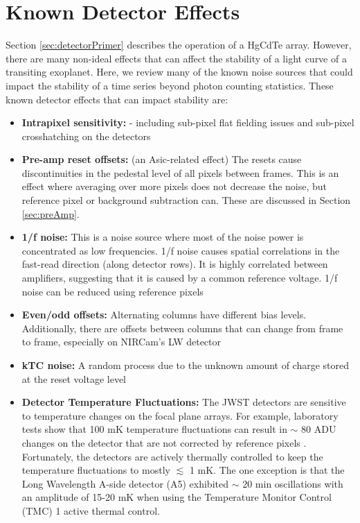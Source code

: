 \documentclass{aastex62}
\begin{document}
\section{Known Detector Effects}\label{sec:knownEffects}
Section \ref{sec:detectorPrimer} describes the operation of a HgCdTe array.
However, there are many non-ideal effects that can affect the stability of a light curve of a transiting exoplanet.
Here, we review many of the known noise sources that could impact the stability of a time series beyond photon counting statistics. These known detector effects that can impact stability are:

\begin{itemize}[noitemsep]
	\item \textbf{Intrapixel sensitivity:} - including sub-pixel flat fielding issues and sub-pixel crosshatching on the detectors \citep{shapiro2018crosshatch}
	\item \textbf{Pre-amp reset offsets:} (an Asic-related effect) 
The resets cause discontinuities in the pedestal level of all pixels between frames. This is an effect where averaging over more pixels does not decrease the noise, but reference pixel or background subtraction can. These are discussed in Section \ref{sec:preAmp}.
	\item \textbf{1/f noise:} This is a noise source where most of the noise power is concentrated as low frequencies. 1/f noise causes spatial correlations in the fast-read direction (along detector rows). It is highly correlated between amplifiers, suggesting that it is caused by a common reference voltage. 1/f noise can be reduced using reference pixels
	\item \textbf{Even/odd offsets:} Alternating columns have different bias levels. Additionally, there are offsets between columns that can change from frame to frame, especially on NIRCam's LW detector
	\item \textbf{kTC noise:} A random process due to the unknown amount of charge stored at the reset voltage level
	\item \textbf{Detector Temperature Fluctuations:} The JWST detectors are sensitive to temperature changes on the focal plane arrays. For example, laboratory tests show that 100 mK temperature fluctuations can result in $\sim$ 80 ADU changes on the detector that are not corrected by reference pixels \citep{hall2005jwstArrays}. Fortunately, the detectors are actively thermally controlled to keep the temperature fluctuations to mostly $\lesssim$ 1 mK.
The one exception is that the Long Wavelength A-side detector (A5) exhibited $\sim$ 20 min oscillations with an amplitude of 15-20 mK when using the Temperature Monitor Control (TMC) 1 active thermal control.

\end{itemize}
\end{document}
